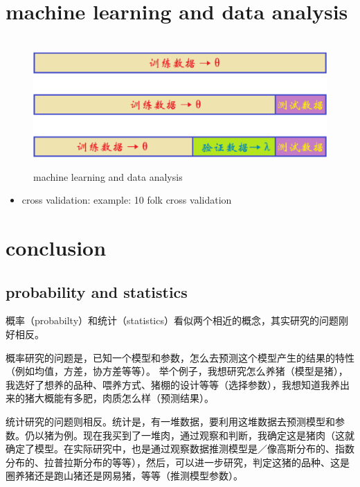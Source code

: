 \documentclass[12pt]{ctexart}%
\begin{document}
	\section{\quad machine learning and data analysis}
	\begin{figure}[H]
		\vspace{-0.5cm}  %
		\setlength{\abovecaptionskip}{-0.2cm}   %
		\centering
		\includegraphics[scale=0.4]{machine_learning_and_data_analysis.png}
		\renewcommand{\figurename}{Fig} %
		\caption{machine learning and data analysis}
		\label{fig:3}
	\end{figure}
	\begin{itemize}
		\item cross validation:
		\subitem example: 10 folk cross validation
	\end{itemize}

	\section{ conclusion}
		\subsection{\quad probability and statistics}
			概率（probabilty）和统计（statistics）看似两个相近的概念，其实研究的问题刚好相反。
			
			
			概率研究的问题是，已知一个模型和参数，怎么去预测这个模型产生的结果的特性（例如均值，方差，协方差等等）。 举个例子，我想研究怎么养猪（模型是猪），我选好了想养的品种、喂养方式、猪棚的设计等等（选择参数），我想知道我养出来的猪大概能有多肥，肉质怎么样（预测结果）。
			
			
			统计研究的问题则相反。统计是，有一堆数据，要利用这堆数据去预测模型和参数。仍以猪为例。现在我买到了一堆肉，通过观察和判断，我确定这是猪肉（这就确定了模型。在实际研究中，也是通过观察数据推测模型是／像高斯分布的、指数分布的、拉普拉斯分布的等等），然后，可以进一步研究，判定这猪的品种、这是圈养猪还是跑山猪还是网易猪，等等（推测模型参数）。
			
\end{document}
